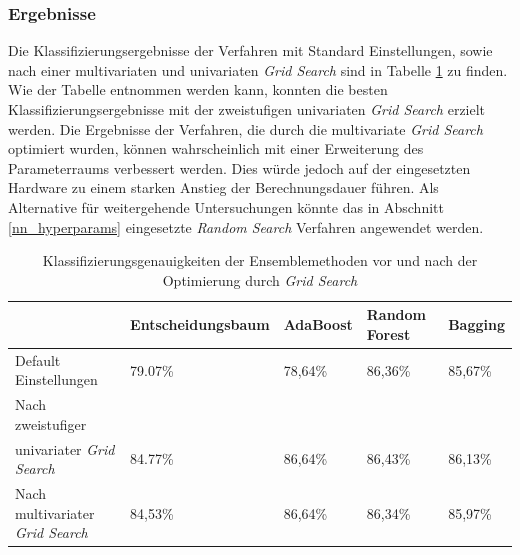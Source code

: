 \subsubsection{Ergebnisse}
Die Klassifizierungsergebnisse der Verfahren mit Standard Einstellungen, sowie nach einer multivariaten und univariaten \emph{Grid Search} sind in Tabelle \ref{table:results_grid} zu finden. Wie der Tabelle entnommen werden kann, konnten die besten Klassifizierungsergebnisse mit der zweistufigen univariaten \emph{Grid Search} erzielt werden. Die Ergebnisse der Verfahren, die durch die multivariate \emph{Grid Search} optimiert wurden, können wahrscheinlich mit einer Erweiterung des Parameterraums verbessert werden. Dies würde jedoch auf der eingesetzten Hardware zu einem starken Anstieg der Berechnungsdauer führen. Als Alternative für weitergehende Untersuchungen könnte das in Abschnitt \ref{nn_hyperparams} eingesetzte \emph{Random Search} Verfahren angewendet werden.

\begin{table}[h]
	\begin{tabular}{lllll}
		\hline
		& Entscheidungsbaum & AdaBoost & Random Forest & Bagging \\ \hline
		Default Einstellungen         &    79.07\%               &  78,64\%        &  86,36\%             &  85,67\%       \\
		Nach zweistufiger\\
		univariater \emph{Grid Search}   &  84.77\%              &  86,64\%        &        86,43\%       &    86,13\%     \\
		Nach multivariater \emph{Grid Search} &  84,53\%                 &  86,64\%      &   86,34\%              &    85,97\%     \\ \hline
	\end{tabular}
	\caption{\label{table:results_grid} Klassifizierungsgenauigkeiten der Ensemblemethoden vor und nach der Optimierung durch \emph{Grid Search}}
\end{table}



